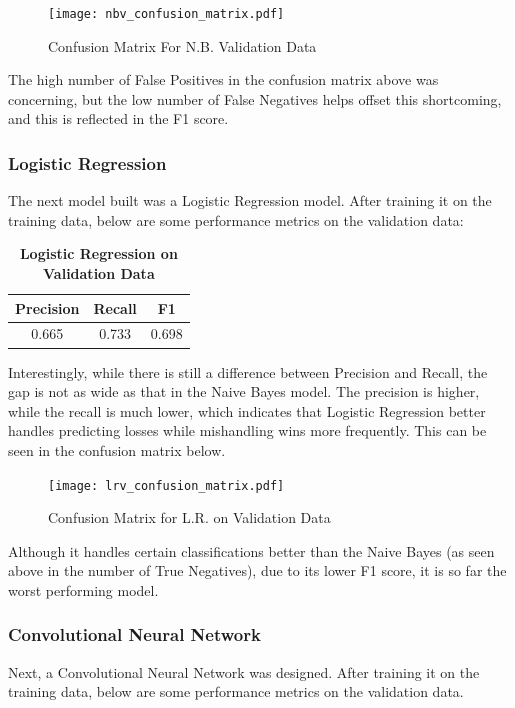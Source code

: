 \documentclass[twocolumn]{article}
\begin{document}
\begin{figure}[H]
    \centering
    \texttt{[image: nbv\_confusion\_matrix.pdf]}
    \caption{Confusion Matrix For N.B. Validation Data}
\end{figure}

The high number of False Positives in the confusion matrix above was concerning, but the low number of False Negatives helps offset this shortcoming, and this is reflected in the F1 score.

\subsubsection{Logistic Regression}

The next model built was a Logistic Regression model. After training it on the training data, below are some performance metrics on the validation data:

\begin{table}[H]
\centering %
\caption{\textbf{Logistic Regression on Validation Data}} 

\begin{tabular}{ccc} 
\toprule
Precision & Recall & F1 \\ 
\midrule
0.665 & 0.733 & 0.698 \\
\bottomrule
\end{tabular}
\end{table}

Interestingly, while there is still a difference between Precision and Recall, the gap is not as wide as that in the Naive Bayes model. The precision is higher, while the recall is much lower, which indicates that Logistic Regression better handles predicting losses while mishandling wins more frequently. This can be seen in the confusion matrix below.

\begin{figure}[H]
    \centering
    \texttt{[image: lrv\_confusion\_matrix.pdf]}
    \caption{Confusion Matrix for L.R. on Validation Data}
\end{figure}

Although it handles certain classifications better than the Naive Bayes (as seen above in the number of True Negatives), due to its lower F1 score, it is so far the worst performing model.

\subsubsection{Convolutional Neural Network}
Next, a Convolutional Neural Network was designed. After training it on the training data, below are some performance metrics on the validation data. 
\end{document}

